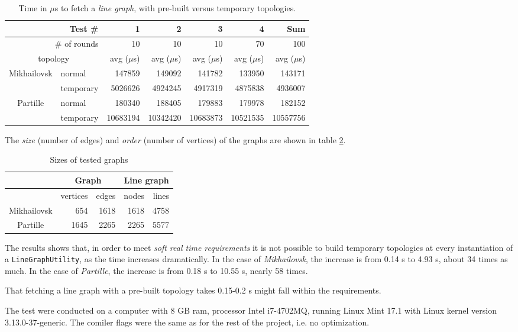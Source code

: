 \documentclass[../main.tex]{subfiles}
\begin{document}
\begin{table}[h]
\centering
\caption{Time in $\mu$s to fetch a \textit{line graph}, with pre-built versus temporary topologies.}
    \begin{tabular}{|c|l|r|r|r|r||r|}
    \hline
    \multicolumn{2}{|r|}{Test \#} & 1 & 2 & 3 & 4 & Sum \\
    \hline
    \hline
    \multicolumn{2}{|r|}{\# of rounds} & 10 & 10 & 10 & 70 & 100\\
    \hline
    \multicolumn{2}{|c||}{topology} & avg ($\mu$s) & avg ($\mu$s) & avg ($\mu$s) & avg ($\mu$s) & avg ($\mu$s) \\
    \hline
    \hline
    \multirow{2}{5em}{Mikhailovsk} & normal & 147859 & 149092 & 141782 & 133950 & 143171 \\
     & temporary & 5026626 & 4924245 & 4917319 & 4875838 & 4936007 \\
    \hline
    \multirow{2}{5em}{Partille} & normal & 180340 & 188405 & 179883 & 179978 & 182152\\
     & temporary & 10683194 & 10342420 & 10683873 & 10521535 & 10557756\\
    \hline
    \end{tabular}
\label{table:test-results}
\end{table}

The \textit{size} (number of edges) and \textit{order} (number of vertices) of the graphs are shown in table \ref{table:graph-sizes}.

\begin{table}[h]
\centering
\caption{Sizes of tested graphs}
    \begin{tabular}{|c|r|r|r|r|}
    \hline
     & \multicolumn{2}{c|}{Graph} & \multicolumn{2}{|c|}{Line graph}  \\
    \hline
     & vertices & edges & nodes & lines \\
    \hline
    \hline
    Mikhailovsk & 654 & 1618 & 1618 & 4758 \\
    \hline
    Partille & 1645 & 2265 & 2265 & 5577 \\
    \hline
    \end{tabular}
\label{table:graph-sizes}
\end{table}

The results shows that, in order to meet \textit{soft real time requirements} it is not possible to build temporary topologies at every instantiation of a \texttt{LineGraphUtility}, as the time increases dramatically. In the case of \textit{Mikhailovsk}, the increase is from 0.14 s to 4.93 s, about 34 times as much. In the case of \textit{Partille}, the increase is from 0.18 s to 10.55 s, nearly 58 times. 

That fetching a line graph with a pre-built topology takes 0.15-0.2 s might fall within the requirements.

The test were conducted on a computer with 8 GB ram, processor Intel i7-4702MQ, running Linux Mint 17.1 with Linux kernel version 3.13.0-37-generic. The comiler flags were the same as for the rest of the project, i.e. no optimization.
\end{document}
